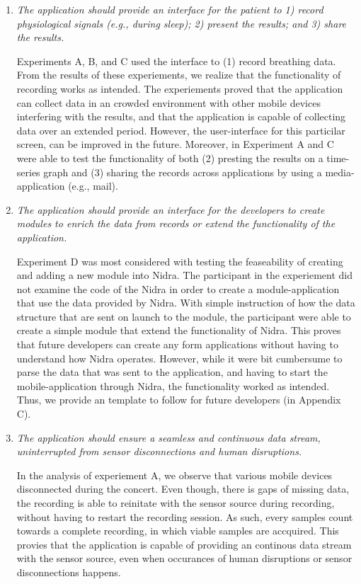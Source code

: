 \begin{enumerate}
    \item \textit{The application should provide an interface for the patient to 1) record physiological signals (e.g., during sleep); 2) present the results; and 3) share the results.}
    
    Experiments A, B, and C used the interface to (1) record breathing data. From the results of these experiements, we realize that the functionality of recording works as intended. The experiements proved that the application can collect data in an crowded environment with other mobile devices interfering with the results, and that the application is capable of collecting data over an extended period. However, the user-interface for this particilar screen, can be improved in the future. Moreover, in Experiment A and C were able to test the functionality of both (2) presting the results on a time-series graph and (3) sharing the records across applications by using a media-application (e.g., mail). 

    \item \textit{The application should provide an interface for the developers to create modules to enrich the data from records or extend the functionality of the application.}
    
    Experiment D was most considered with testing the feaseability of creating and adding a new module into Nidra. The participant in the experiement did not examine the code of the Nidra in order to create a module-application that use the data provided by Nidra. With simple instruction of how the data structure that are sent on launch to the module, the participant were able to create a simple module that extend the functionality of Nidra. This proves that future developers can create any form applications without having to understand how Nidra operates. However, while it were bit cumbersume to parse the data that was sent to the application, and having to start the mobile-application through Nidra, the functionality worked as intended. Thus, we provide an template to follow for future developers (in Appendix C). 
    
    \item \textit{The application should ensure a seamless and continuous data stream, uninterrupted from sensor disconnections and human disruptions.}
    
    In the analysis of experiement A, we observe that various mobile devices disconnected during the concert. Even though, there is gaps of missing data, the recording is able to reinitate with the sensor source during recording, without having to restart the recording session. As such, every samples count towards a complete recording, in which viable samples are accquired. This provies that the application is capable of providing an continous data stream with the sensor source, even when occurances of human disruptions or sensor disconnections happens. 
    
\end{enumerate}

